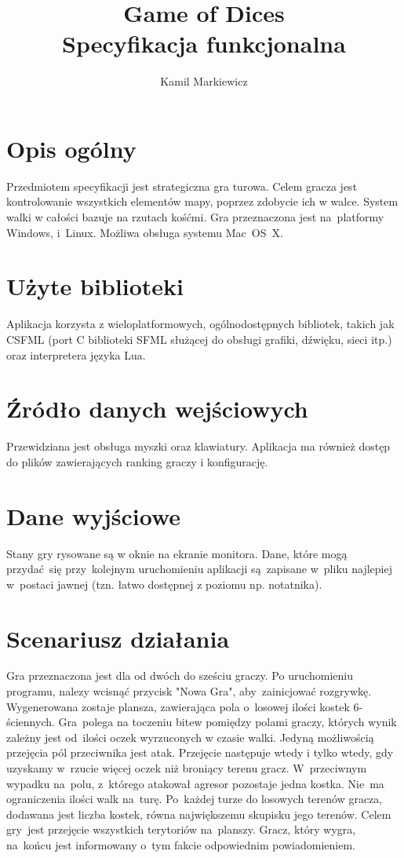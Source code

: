 \documentclass[11pt,a4paper]{article}
\title{Game of Dices \\ \small{Specyfikacja funkcjonalna}}
\author{Kamil Markiewicz}
\begin{document}
\maketitle


\section{Opis ogólny}\label{sec:general}
Przedmiotem specyfikacji jest strategiczna gra turowa. Celem gracza jest kontrolowanie wszystkich elementów mapy, poprzez zdobycie ich w walce. System walki w całości bazuje na rzutach kośćmi. Gra przeznaczona jest na~platformy Windows, i~Linux. Możliwa obsługa systemu Mac~OS~X.

\section{Użyte biblioteki}\label{sec:libs}
Aplikacja korzysta z wieloplatformowych, ogólnodostępnych bibliotek, takich jak CSFML (port C biblioteki SFML służącej do obsługi grafiki, dźwięku, sieci itp.) oraz interpretera języka Lua.

\section{Źródło danych wejściowych}\label{sec:input}
Przewidziana jest obsługa myszki oraz klawiatury. Aplikacja ma również dostęp do plików zawierających ranking graczy i konfigurację.

\section{Dane wyjściowe}\label{sec:output}
Stany gry rysowane są w oknie na ekranie monitora. Dane, które mogą przydać~się przy~kolejnym uruchomieniu aplikacji są~zapisane w~pliku najlepiej w~postaci jawnej (tzn. łatwo dostępnej z poziomu np. notatnika).

\section{Scenariusz działania}\label{sec:script}
Gra przeznaczona jest dla od dwóch do sześciu graczy.
Po uruchomieniu programu, nalezy wcisnąć przycisk "Nowa Gra", aby~zainicjować rozgrywkę. Wygenerowana zostaje plansza, zawierająca pola o~losowej ilości kostek 6-ściennych.
Gra~polega na toczeniu bitew pomiędzy polami graczy, których wynik zależny jest od~ilości oczek wyrzuconych w czasie walki. Jedyną możliwością przejęcia pól przeciwnika jest atak. Przejęcie następuje wtedy i tylko wtedy, gdy uzyskamy w~rzucie więcej oczek niż broniący terenu gracz. W~przeciwnym wypadku na~polu, z~którego atakował agresor pozostaje jedna kostka. Nie~ma ograniczenia ilości walk na~turę. Po~każdej turze do losowych terenów gracza, dodawana jest liczba kostek, równa największemu skupisku jego terenów. Celem gry~jest przejęcie wszystkich terytoriów na~planszy. Gracz, który wygra, na~końcu jest informowany o~tym fakcie odpowiednim powiadomieniem.
\end{document}
